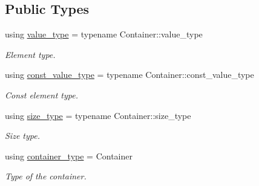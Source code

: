 \subsection*{Public Types}
\begin{DoxyCompactItemize}
\item 
\mbox{\label{classatom_1_1stack__t_a37733753643a75fca01979480f888d8e}} 
using \hyperlink{classatom_1_1stack__t_a37733753643a75fca01979480f888d8e}{value\+\_\+type} = typename Container\+::value\+\_\+type
\begin{DoxyCompactList}\small\item\em Element type. \end{DoxyCompactList}\item 
\mbox{\label{classatom_1_1stack__t_a780222269dc9f9323438ec4c56795735}} 
using \hyperlink{classatom_1_1stack__t_a780222269dc9f9323438ec4c56795735}{const\+\_\+value\+\_\+type} = typename Container\+::const\+\_\+value\+\_\+type
\begin{DoxyCompactList}\small\item\em Const element type. \end{DoxyCompactList}\item 
\mbox{\label{classatom_1_1stack__t_a43888b80c0b6cceea0509a3646823f98}} 
using \hyperlink{classatom_1_1stack__t_a43888b80c0b6cceea0509a3646823f98}{size\+\_\+type} = typename Container\+::size\+\_\+type
\begin{DoxyCompactList}\small\item\em Size type. \end{DoxyCompactList}\item 
\mbox{\label{classatom_1_1stack__t_ab18a4ad6c754ddb70ce585528823eac2}} 
using \hyperlink{classatom_1_1stack__t_ab18a4ad6c754ddb70ce585528823eac2}{container\+\_\+type} = Container
\begin{DoxyCompactList}\small\item\em Type of the container. \end{DoxyCompactList}\end{DoxyCompactItemize}
